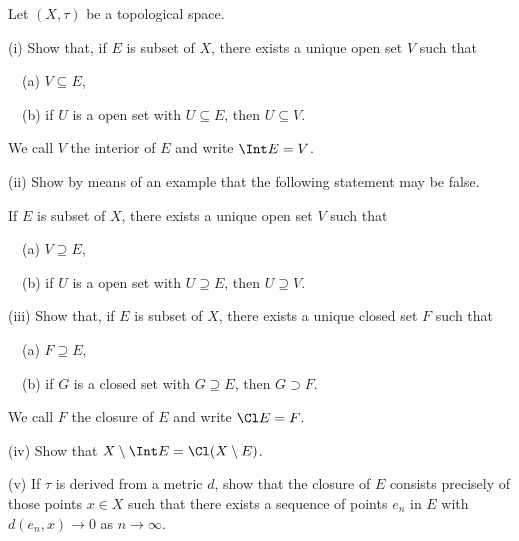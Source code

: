 \begin{exercise}\label{E;interior} 
Let $(X,\tau)$ be a topological space.

(i) Show that, if $E$ is subset of $X$, there exists a unique
open set $V$ such that

\ \ (a) $V\subseteq E$,

\ \ (b) if $U$ is a open set with $U\subseteq E$,
then $U\subseteq V$.

We call $V$ the interior of $E$ and write $\Int E=V$.

(ii) Show by means of an example that the following statement
may be false.
                                                                                   
If $E$ is subset of $X$, there exists a unique
open set $V$ such that
                                                                          
\ \ (a) $V\supseteq E$, 
                                                         
\ \ (b) if $U$ is a open set with $U\supseteq E$,
then $U\supseteq V$.

(iii) Show that, if $E$ is subset of $X$, there exists a unique
closed set $F$ such that
                                                                
\ \ (a) $F\supseteq E$,
                
\ \ (b) if $G$ is a closed set with $G\supseteq E$,
then $G\supset F$.
                         
We call $F$ the closure of $E$ and write $\Cl E=F$.
                                                                         
(iv) Show that $X\setminus \Int E=\Cl(X\setminus E)$.
                                                                        
(v) If $\tau$ is derived from a metric $d$,
show that the closure of $E$ consists precisely
of those points $x\in X$ such that there exists a sequence
of points $e_{n}$ in $E$
with $d(e_{n},x)\rightarrow 0$ as $n\rightarrow\infty$.
\end{exercise}
